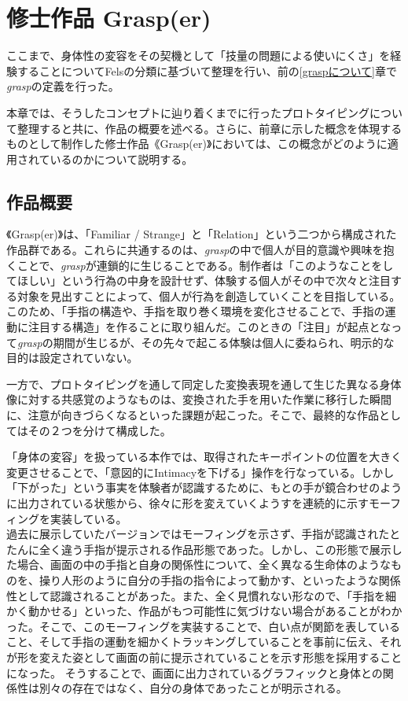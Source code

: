 \chapter{修士作品 Grasp(er)}
ここまで、身体性の変容をその契機として「技量の問題による使いにくさ」を経験することについてFelsの分類に基づいて整理を行い、前の\ref{graspについて}章で\textit{grasp}の定義を行った。

本章では、そうしたコンセプトに辿り着くまでに行ったプロトタイピングについて整理すると共に、作品の概要を述べる。さらに、前章に示した概念を体現するものとして制作した修士作品《Grasp(er)》においては、この概念がどのように適用されているのかについて説明する。\\

\section{作品概要}
《Grasp(er)》は、「Familiar / Strange」と「Relation」という二つから構成された作品群である。これらに共通するのは、\textit{grasp}の中で個人が目的意識や興味を抱くことで、\textit{grasp}が連鎖的に生じることである。制作者は「このようなことをしてほしい」という行為の中身を設計せず、体験する個人がその中で次々と注目する対象を見出すことによって、個人が行為を創造していくことを目指している。このため、「手指の構造や、手指を取り巻く環境を変化させることで、手指の運動に注目する構造」を作ることに取り組んだ。このときの「注目」が起点となって\textit{grasp}の期間が生じるが、その先々で起こる体験は個人に委ねられ、明示的な目的は設定されていない。

一方で、プロトタイピングを通して同定した変換表現を通して生じた異なる身体像に対する共感覚のようなものは、変換された手を用いた作業に移行した瞬間に、注意が向きづらくなるといった課題が起こった。そこで、最終的な作品としてはその２つを分けて構成した。

「身体の変容」を扱っている本作では、取得されたキーポイントの位置を大きく変更させることで、「意図的にIntimacyを下げる」操作を行なっている。しかし「下がった」という事実を体験者が認識するために、もとの手が鏡合わせのように出力されている状態から、徐々に形を変えていくようすを連続的に示すモーフィングを実装している。\\
過去に展示していたバージョンではモーフィングを示さず、手指が認識されたとたんに全く違う手指が提示される作品形態であった。しかし、この形態で展示した場合、画面の中の手指と自身の関係性について、全く異なる生命体のようなものを、操り人形のように自分の手指の指令によって動かす、といったような関係性として認識されることがあった。また、全く見慣れない形なので、「手指を細かく動かせる」といった、作品がもつ可能性に気づけない場合があることがわかった。そこで、このモーフィングを実装することで、白い点が関節を表していること、そして手指の運動を細かくトラッキングしていることを事前に伝え、それが形を変えた姿として画面の前に提示されていることを示す形態を採用することになった。
そうすることで、画面に出力されているグラフィックと身体との関係性は別々の存在ではなく、自分の身体であったことが明示される。\\

